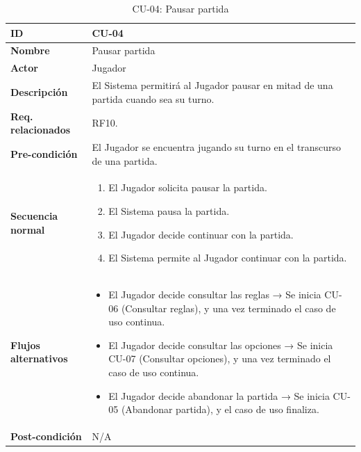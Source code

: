 \begin{table}[H]
	\centering
	\begin{tabular}{|p{3cm}|p{14cm}|}
		\hline \textbf{ID} & CU-04 \\
		\hline \textbf{Nombre} & Pausar partida \\
		\hline \textbf{Actor} & Jugador \\
		\hline \textbf{Descripción} & El Sistema permitirá al Jugador pausar en mitad de una partida cuando sea su turno. \\
		\hline \textbf{Req. relacionados} & RF10. \\
		\hline \textbf{Pre-condición} & El Jugador se encuentra jugando su turno en el transcurso de una partida. \\
		\hline
		\textbf{Secuencia normal} &
		\begin{enumerate}[nosep, before=\vspace{-0.4\baselineskip}]
			\item El Jugador solicita pausar la partida.
			\item El Sistema pausa la partida.
			\item El Jugador decide continuar con la partida.
			\item El Sistema permite al Jugador continuar con la partida.
		\end{enumerate} \\
		\hline
		\textbf{Flujos alternativos} &
		\begin{itemize}[nosep, before=\vspace{-0.4\baselineskip}]
			\item [{1.a.}] El Jugador decide consultar las reglas → Se inicia CU-06 (Consultar reglas), y una vez terminado el caso de uso continua.
			\item [{1.b.}] El Jugador decide consultar las opciones → Se inicia CU-07 (Consultar opciones), y una vez terminado el caso de uso continua.
			\item [{1.c.}] El Jugador decide abandonar la partida → Se inicia CU-05 (Abandonar partida), y el caso de uso finaliza.
		\end{itemize} \\
		\hline \textbf{Post-condición} & N/A \\
		\hline
	\end{tabular}
	\caption{CU-04: Pausar partida}
	\label{tab:cu04}
\end{table}

\clearpage


